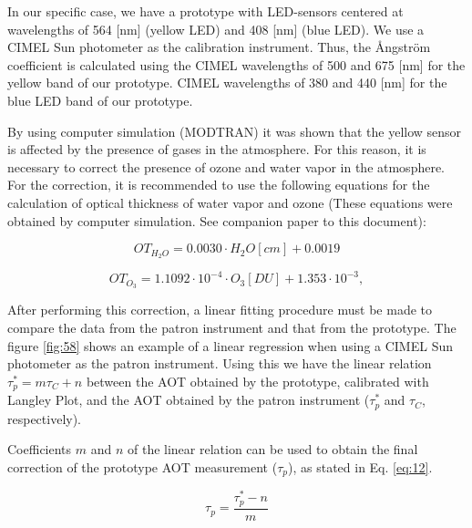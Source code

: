 \documentclass[12pt,letterpaper]{article}
\numberwithin{figure}{section}
\numberwithin{equation}{section}
\numberwithin{table}{section}
\begin{document}
In our specific case, we have a prototype with LED-sensors centered at wavelengths of 564 [nm] (yellow LED) and 408 [nm] (blue LED). We use a CIMEL Sun photometer as the calibration instrument. Thus, the {\AA}ngstr\"{o}m coefficient is calculated using the CIMEL wavelengths of 500 and 675 [nm] for the yellow band of our prototype. CIMEL wavelengths of 380 and 440 [nm] for the blue LED band of our prototype.

By using computer simulation (MODTRAN) it was shown that the yellow sensor is affected by the presence of gases in the atmosphere. For this reason, it is necessary to correct the presence of ozone and water vapor in the atmosphere. For the correction, it is recommended to use the following equations for the calculation of optical thickness of water vapor and ozone (These equations were obtained by computer simulation. See companion paper to this document):

\begin{equation}
OT_{H_2 O} = 0.0030 \cdot H_2O[cm] + 0.0019
\label{eq:10}
\end{equation}

\begin{equation}
OT_{O_3} = 1.1092 \cdot 10^{-4} \cdot O_3[DU] + 1.353 \cdot 10^{-3}, 
\label{eq:11}
\end{equation} 


After performing this correction, a linear fitting procedure must be made to compare the data from the patron instrument and that from the prototype. The figure \ref{fig:58} shows an example of a linear regression when using a CIMEL Sun photometer as the patron instrument. Using this we have the linear relation $\tau^*_p=m \tau_C + n$ between the AOT obtained by the prototype, calibrated with Langley Plot, and the AOT obtained by the patron instrument ($\tau_p^*$ and $\tau_C$, respectively).

Coefficients $m$ and $n$ of the linear relation can be used to obtain the final correction of the prototype AOT measurement ($\tau_p$), as stated in Eq. \ref{eq:12}.

\begin{equation}
    \tau_{p} = \frac{\tau_{p}^*-n}{m}
    \label{eq:12}
\end{equation}
\end{document}
